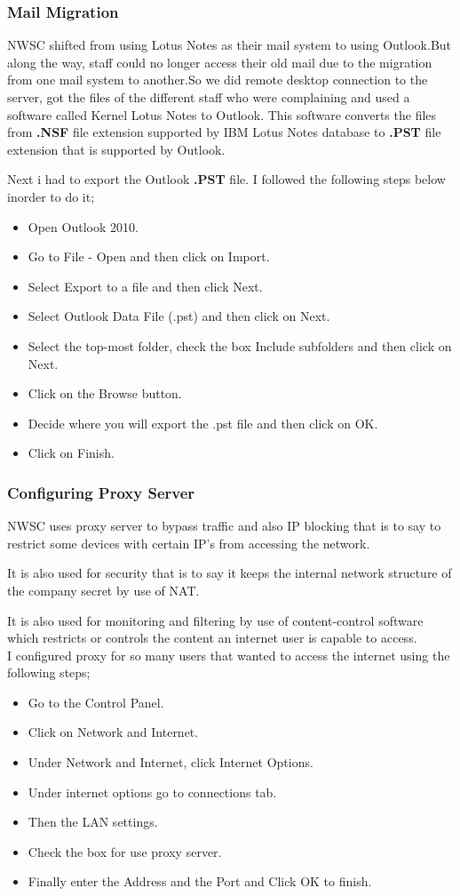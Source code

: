 \documentclass{article}
\begin{document}
\subsubsection{Mail Migration}
NWSC shifted from using Lotus Notes as their mail system to using Outlook.But along the way, staff could no longer access their old mail due to the migration from one mail system to another.So we did remote desktop connection to the server, got the files of the different staff who were complaining and used a software called Kernel Lotus Notes to Outlook. This software converts the files from \textbf{.NSF} file extension supported by IBM Lotus Notes database to \textbf{.PST} file extension that is supported by Outlook.
\par Next i had to export the Outlook \textbf{.PST} file. I followed the following steps below inorder to do it;
\begin{itemize}
\item Open Outlook 2010.
\item Go to File - Open and then click on Import.
\item Select Export to a file and then click Next.
\item Select Outlook Data File (.pst) and then click on Next.
\item Select the top-most folder, check the box Include subfolders and then click on Next.
\item Click on the Browse button.
\item Decide where you will export the .pst file and then click on OK.
\item Click on Finish.
\end{itemize}
\subsubsection{Configuring Proxy Server}
NWSC uses proxy server to bypass traffic and also IP blocking that is to say to restrict some devices with certain IP's from accessing the network.
\par It is also used for security that is to say it keeps the internal network  structure of the company secret by use of NAT.
\par It is also used for monitoring and filtering by use of content-control software which restricts or controls the content an internet user is capable to access.\\
I configured proxy for so many users that wanted to access the internet using the following steps;
\begin{itemize}
\item Go to the Control Panel.
\item Click on Network and Internet.
\item Under Network and Internet, click Internet Options.
\item Under internet options go to connections tab.
\item Then the LAN settings.
\item Check the box for use proxy server.
\item Finally enter the Address and the Port and Click OK to finish.
\end{itemize}
\end{document}
